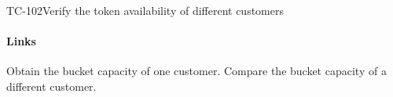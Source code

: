 \begin{testcase}{TC-102}{Verify the token availability of different customers}
\paragraph{Links} 

\begin{testprocedure}
    \stage Obtain the bucket capacity of one customer.
    \stage Compare the bucket capacity of a different customer.
\end{testprocedure}
\end{testcase}